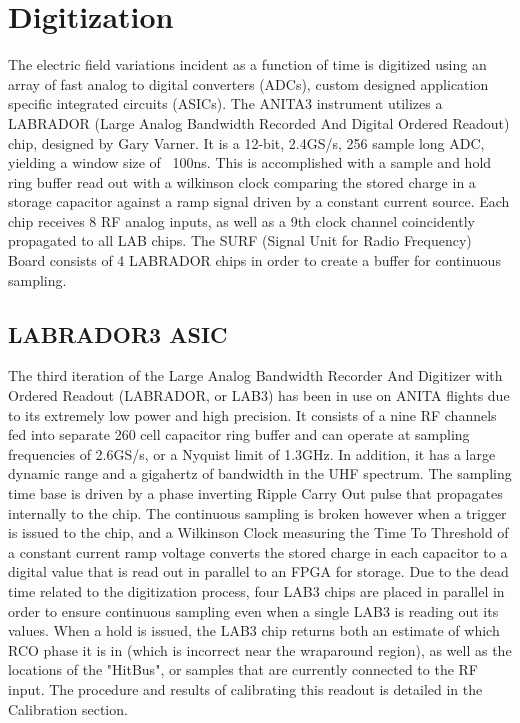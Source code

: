	
\section{Digitization}
	The electric field variations incident as a function of time is digitized using an array of fast analog to digital converters (ADCs), custom designed application specific integrated circuits (ASICs).  The ANITA3 instrument utilizes a LABRADOR (Large Analog Bandwidth Recorded And Digital Ordered Readout) chip, designed by Gary Varner.  It is a 12-bit, 2.4GS/s, 256 sample long ADC, yielding a window size of ~100ns.  This is accomplished with a sample and hold ring buffer read out with a wilkinson clock comparing the stored charge in a storage capacitor against a ramp signal driven by a constant current source.  Each chip receives 8 RF analog inputs, as well as a 9th clock channel coincidently propagated to all LAB chips.  The SURF (Signal Unit for Radio Frequency) Board consists of 4 LABRADOR chips in order to create a buffer for continuous sampling.  

	\subsection{LABRADOR3 ASIC}
		The third iteration of the Large Analog Bandwidth Recorder And Digitizer with Ordered Readout (LABRADOR, or LAB3) has been in use on ANITA flights due to its extremely low power and high precision.  It consists of a nine RF channels fed into separate 260 cell capacitor ring buffer and can operate at sampling frequencies of 2.6GS/s, or a Nyquist limit of 1.3GHz.  In addition, it has a large dynamic range and a gigahertz of bandwidth in the UHF spectrum.  The sampling time base is driven by a phase inverting Ripple Carry Out pulse that propagates internally to the chip.  The continuous sampling is broken however when a trigger is issued to the chip, and a Wilkinson Clock measuring the Time To Threshold of a constant current ramp voltage converts the stored charge in each capacitor to a digital value that is read out in parallel to an FPGA for storage.  Due to the dead time related to the digitization process, four LAB3 chips are placed in parallel in order to ensure continuous sampling even when a single LAB3 is reading out its values.  When a hold is issued, the LAB3 chip returns both an estimate of which RCO phase it is in (which is incorrect near the wraparound region), as well as the locations of the "HitBus", or samples that are currently connected to the RF input. The procedure and results of calibrating this readout is detailed in the Calibration section.
	
